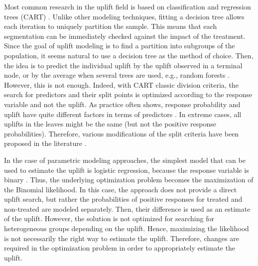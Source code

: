 \documentclass{article}
\begin{document}
Most common research in the uplift field is based on classification and regression trees (CART) \citep{breiman1984classification}. Unlike other modeling techniques, fitting a decision tree allows each iteration to uniquely partition the sample. This means that each segmentation can be immediately checked against the impact of the treatment. Since the goal of uplift modeling is to find a partition into subgroups of the population, it seems natural to use a decision tree as the method of choice. Then, the idea is to predict the individual uplift by the uplift observed in a terminal node, or by the average when several trees are used, e.g., random forests \citep{Breiman-RandomForest-2001}. However, this is not enough. Indeed, with CART classic division criteria, the search for predictors and their split points is optimized according to the response variable and not the uplift. As practice often shows, response probability and uplift have quite different factors in terms of predictors \citep{radcliffe2011real}. In extreme cases, all uplifts in the leaves might be the same (but not the positive response probabilities). Therefore, various modifications of the split criteria have been proposed in the literature \citep{radcliffe1999differential, hansotia2002direct, rzepakowski2010decision}.



In the case of parametric modeling approaches, the simplest model that can be used to estimate the uplift is logistic regression, because the response variable is binary \citep{lo2002true}. Thus, the underlying optimization problem becomes the maximization of the Binomial likelihood. In this case, the approach does not provide a direct uplift search, but rather the probabilities of positive responses for treated and non-treated are modeled separately. Then, their difference is used as an estimate of the uplift.
However, the solution is not optimized for searching for heterogeneous groups depending on the uplift. Hence, maximizing the likelihood is not necessarily the right way to estimate the uplift. Therefore, changes are required in the optimization problem in order to appropriately estimate the uplift. 
\end{document}
